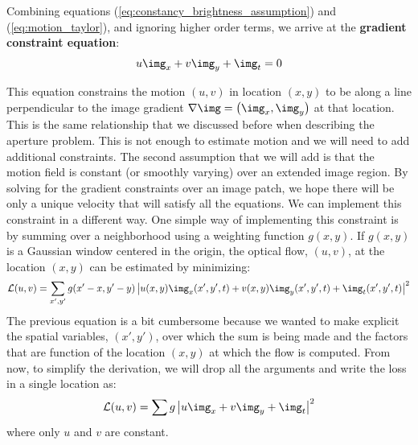 Combining equations (\ref{eq:constancy_brightness_assumption}) and (\ref{eq:motion_taylor}), and ignoring higher order terms, we arrive at the {\bf gradient constraint equation}: 
\begin{equation}
    u \img_x  + v \img_y + \img_t  = 0
\end{equation}

This equation constrains the motion $(u,v)$ in location $(x,y)$ to be along a line perpendicular to the image gradient
$\nabla \img = \left( \img_x, \img_y \right)$
at that location. This is the same relationship that we discussed before when describing the aperture problem. This is not enough to estimate motion and we will need to add additional constraints. The second assumption that we will add is that the motion field is constant (or smoothly varying) over an extended image region. By solving for the gradient constraints over an image patch, we hope there will be only a unique velocity that will satisfy all the equations. We can implement this constraint in a different way. One simple way of implementing this constraint is by summing over a neighborhood using a weighting function $g(x,y)$.
If $g(x,y)$ is a Gaussian window centered in the origin, the optical flow, $(u,v)$, at the location $(x,y)$ can be estimated by minimizing:
\begin{equation}
    \mathcal{L}(u, v) = \sum_{x',y'} g(x'-x,y'-y) \left| u(x,y) \img_x (x',y',t) + v(x,y) \img_y(x',y',t) + \img_t(x',y',t) \right| ^2
\end{equation}
The previous equation is a bit cumbersome because we wanted to make explicit the spatial variables, $(x',y')$, over which the sum is being made and the factors that are function of the location $(x,y)$ at which the flow is computed. From now, to simplify the derivation, we will drop all the arguments and write the loss in a single location as:
\begin{equation}
    \mathcal{L}(u, v) = \sum g \left| u \img_x  + v \img_y + \img_t \right| ^2
\end{equation}
where only $u$ and $v$ are constant.

